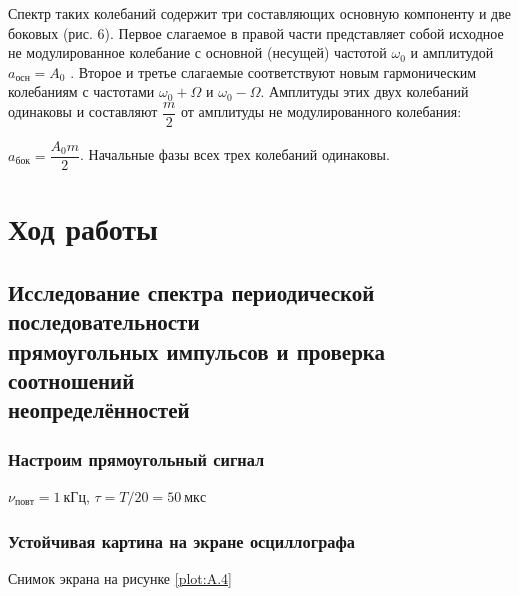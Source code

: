 \documentclass[a4paper, 12pt]{article}
\begin{document}
                Спектр таких колебаний содержит три составляющих  основную компоненту и две боковых (рис. 6). Первое слагаемое в правой части представляет собой исходное не модулированное колебание с основной (несущей) частотой $\omega_{0}$ и амплитудой $a_{осн} = A_{0}$ . Второе и третье слагаемые соответствуют новым гармоническим колебаниям с частотами $\omega_{0} + \Omega$ и $\omega_{0} - \Omega$. Амплитуды этих двух колебаний одинаковы и составляют $\dfrac{m}{2}$ от амплитуды не модулированного колебания:

                $a_{бок} = \dfrac{A_{0}m}{2}$. Начальные фазы всех трех колебаний одинаковы.

    \section{Ход работы}

        \subsection{Исследование спектра периодической последовательности\\прямоугольных импульсов и проверка соотношений\\неопределённостей}

            \setcounter{subsubsection}{2}
            \subsubsection{Настроим прямоугольный сигнал}

                $\nu_{повт} = 1~кГц$, $\tau = T/20 = 50~мкс$

            \subsubsection{Устойчивая картина на экране осциллографа}

                Снимок экрана на рисунке \ref{plot:A.4}
\end{document}
